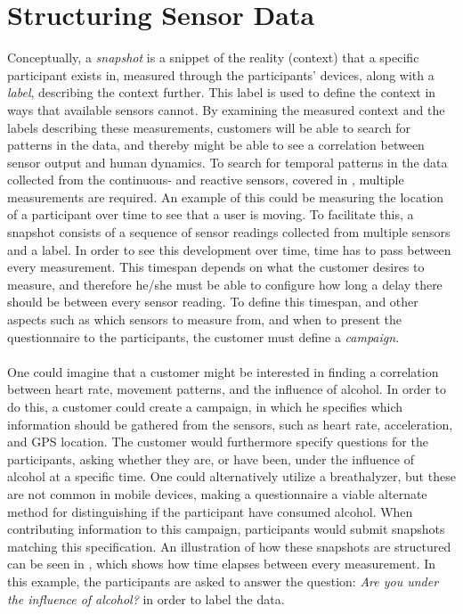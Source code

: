 
\section{Structuring Sensor Data}
\label{sec:modeling_sensor_data}


Conceptually, a \emph{snapshot} is a snippet of the reality (context) that a specific participant exists in, measured through the participants' devices, along with a \emph{label}, describing the context further. This label is used to define the context in ways that available sensors cannot. By examining the measured context and the labels describing these measurements, customers will be able to search for patterns in the data, and thereby might be able to see a correlation between sensor output and human dynamics. To search for temporal patterns in the data collected from the continuous- and reactive sensors, covered in , multiple measurements are required. An example of this could be measuring the location of a participant over time to see that a user is moving. To facilitate this, a snapshot consists of a sequence of sensor readings collected from multiple sensors and a label. In order to see this development over time, time has to pass between every measurement. This timespan depends on what the customer desires to measure, and therefore he/she must be able to configure how long a delay there should be between every sensor reading. To define this timespan, and other aspects such as which sensors to measure from, and when to present the questionnaire to the participants, the customer must define a \emph{campaign}.
\\\\
One could imagine that a customer might be interested in finding a correlation between heart rate, movement patterns, and the influence of alcohol. In order to do this, a customer could create a campaign, in which he specifies which information should be gathered from the sensors, such as heart rate, acceleration, and GPS location. The customer would furthermore specify questions for the participants, asking whether they are, or have been, under the influence of alcohol at a specific time. One could alternatively utilize a breathalyzer, but these are not common in mobile devices, making a questionnaire a viable alternate method for distinguishing if the participant have consumed alcohol. When contributing information to this campaign, participants would submit snapshots matching this specification. An illustration of how these snapshots are structured can be seen in , which shows how time elapses between every measurement. In this example, the participants are asked to answer the question: \emph{Are you under the influence of alcohol?} in order to label the data.
